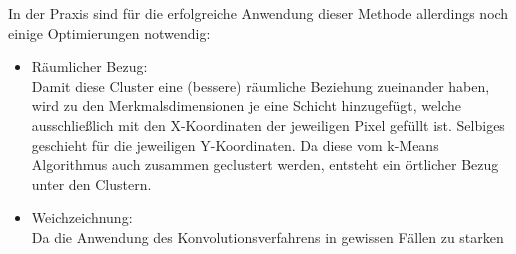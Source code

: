 In der Praxis sind für die erfolgreiche Anwendung dieser Methode allerdings noch einige Optimierungen notwendig:

\begin{itemize}
	\item Räumlicher Bezug:\\
Damit diese Cluster eine (bessere) räumliche Beziehung zueinander haben, wird zu den Merkmalsdimensionen je eine Schicht hinzugefügt, welche ausschließlich mit den X-Koordinaten der jeweiligen Pixel gefüllt ist. Selbiges geschieht für die jeweiligen Y-Koordinaten. Da diese vom k-Means Algorithmus auch zusammen geclustert werden, entsteht ein örtlicher Bezug unter den Clustern.
	\item Weichzeichnung:\\
Da die Anwendung des Konvolutionsverfahrens in gewissen Fällen zu starken 
\end{itemize}
